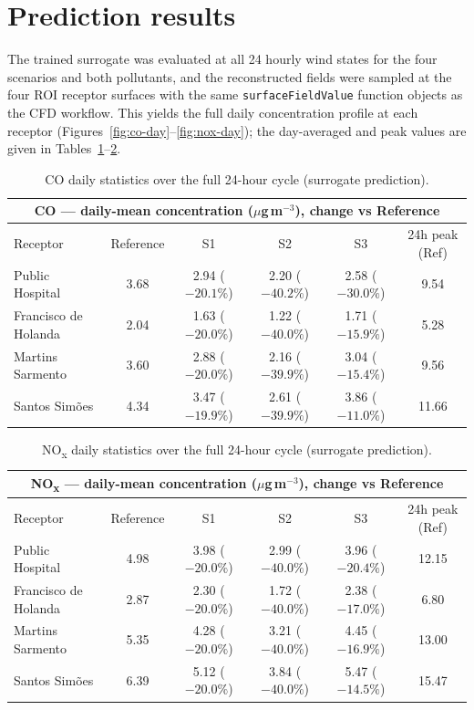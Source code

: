 \documentclass[11pt]{article}
\newcommand{\imp}[1]{{\color{good}#1}}
\begin{document}
\section{Prediction results}
The trained surrogate was evaluated at all 24 hourly wind states for the four scenarios and both
pollutants, and the reconstructed fields were sampled at the four ROI receptor surfaces with the
same \texttt{surfaceFieldValue} function objects as the CFD workflow. This yields the full daily
concentration profile at each receptor (Figures~\ref{fig:co-day}--\ref{fig:nox-day}); the
day-averaged and peak values are given in Tables~\ref{tab:co}--\ref{tab:nox}.

\begin{table}[h]
\centering
\begin{tabular}{@{}lccccc@{}}
\toprule
\multicolumn{6}{c}{\textbf{CO} --- daily-mean concentration ($\mu$g\,m$^{-3}$), change vs Reference} \\
\midrule
Receptor & Reference & S1 & S2 & S3 & 24h peak (Ref) \\
\midrule
Public Hospital       & 3.68 & 2.94 \imp{($-20.1\%$)} & 2.20 \imp{($-40.2\%$)} & 2.58 \imp{($-30.0\%$)} & 9.54 \\
Francisco de Holanda  & 2.04 & 1.63 \imp{($-20.0\%$)} & 1.22 \imp{($-40.0\%$)} & 1.71 \imp{($-15.9\%$)} & 5.28 \\
Martins Sarmento      & 3.60 & 2.88 \imp{($-20.0\%$)} & 2.16 \imp{($-39.9\%$)} & 3.04 \imp{($-15.4\%$)} & 9.56 \\
Santos Sim\~oes       & 4.34 & 3.47 \imp{($-19.9\%$)} & 2.61 \imp{($-39.9\%$)} & 3.86 \imp{($-11.0\%$)} & 11.66 \\
\bottomrule
\end{tabular}
\caption{CO daily statistics over the full 24-hour cycle (surrogate prediction).}
\label{tab:co}
\end{table}

\begin{table}[h]
\centering
\begin{tabular}{@{}lccccc@{}}
\toprule
\multicolumn{6}{c}{\textbf{NO\textsubscript{x}} --- daily-mean concentration ($\mu$g\,m$^{-3}$), change vs Reference} \\
\midrule
Receptor & Reference & S1 & S2 & S3 & 24h peak (Ref) \\
\midrule
Public Hospital       & 4.98 & 3.98 \imp{($-20.0\%$)} & 2.99 \imp{($-40.0\%$)} & 3.96 \imp{($-20.4\%$)} & 12.15 \\
Francisco de Holanda  & 2.87 & 2.30 \imp{($-20.0\%$)} & 1.72 \imp{($-40.0\%$)} & 2.38 \imp{($-17.0\%$)} & 6.80 \\
Martins Sarmento      & 5.35 & 4.28 \imp{($-20.0\%$)} & 3.21 \imp{($-40.0\%$)} & 4.45 \imp{($-16.9\%$)} & 13.00 \\
Santos Sim\~oes       & 6.39 & 5.12 \imp{($-20.0\%$)} & 3.84 \imp{($-40.0\%$)} & 5.47 \imp{($-14.5\%$)} & 15.47 \\
\bottomrule
\end{tabular}
\caption{NO\textsubscript{x} daily statistics over the full 24-hour cycle (surrogate prediction).}
\label{tab:nox}
\end{table}
\end{document}
